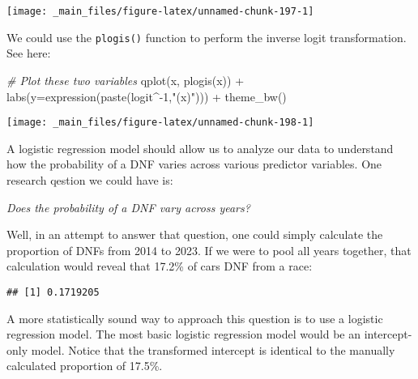 \documentclass[
]{book}
\newenvironment{Shaded}{\begin{snugshade}}{\end{snugshade}}
\newcommand{\AttributeTok}[1]{\textcolor[rgb]{0.77,0.63,0.00}{#1}}
\newcommand{\CommentTok}[1]{\textcolor[rgb]{0.56,0.35,0.01}{\textit{#1}}}
\newcommand{\DecValTok}[1]{\textcolor[rgb]{0.00,0.00,0.81}{#1}}
\newcommand{\FunctionTok}[1]{\textcolor[rgb]{0.00,0.00,0.00}{#1}}
\newcommand{\NormalTok}[1]{#1}
\newcommand{\SpecialCharTok}[1]{\textcolor[rgb]{0.00,0.00,0.00}{#1}}
\newcommand{\StringTok}[1]{\textcolor[rgb]{0.31,0.60,0.02}{#1}}
\begin{document}
\begin{center}\texttt{[image: \_main\_files/figure-latex/unnamed-chunk-197-1]} \end{center}

We could use the \texttt{plogis()} function to perform the inverse logit transformation. See here:

\begin{Shaded}
\begin{Highlighting}[]
\CommentTok{\# Plot these two variables}
\FunctionTok{qplot}\NormalTok{(x, }\FunctionTok{plogis}\NormalTok{(x)) }\SpecialCharTok{+}
  \FunctionTok{labs}\NormalTok{(}\AttributeTok{y=}\FunctionTok{expression}\NormalTok{(}\FunctionTok{paste}\NormalTok{(logit}\SpecialCharTok{\^{}{-}}\DecValTok{1}\NormalTok{,}\StringTok{"(x)"}\NormalTok{))) }\SpecialCharTok{+}
  \FunctionTok{theme\_bw}\NormalTok{()}
\end{Highlighting}
\end{Shaded}

\begin{center}\texttt{[image: \_main\_files/figure-latex/unnamed-chunk-198-1]} \end{center}

A logistic regression model should allow us to analyze our data to understand how the probability of a DNF varies across various predictor variables. One research qestion we could have is:

\emph{Does the probability of a DNF vary across years?}

Well, in an attempt to answer that question, one could simply calculate the proportion of DNFs from 2014 to 2023. If we were to pool all years together, that calculation would reveal that 17.2\% of cars DNF from a race:

\begin{Shaded}
\end{Shaded}

\begin{verbatim}
## [1] 0.1719205
\end{verbatim}

A more statistically sound way to approach this question is to use a logistic regression model. The most basic logistic regression model would be an intercept-only model. Notice that the transformed intercept is identical to the manually calculated proportion of 17.5\%.
\end{document}
